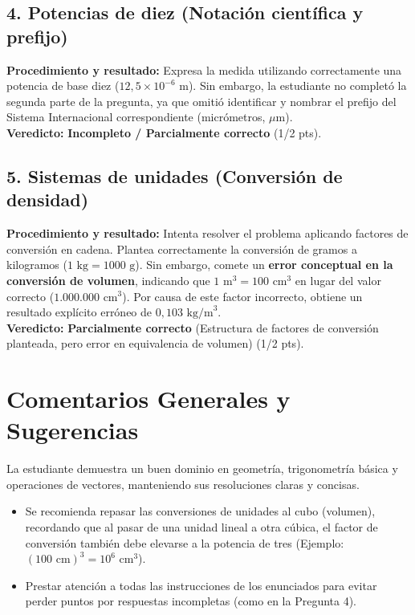 \documentclass[12pt]{article}
\begin{document}
\subsection*{4. Potencias de diez (Notación científica y prefijo)}
\textbf{Procedimiento y resultado:} Expresa la medida utilizando correctamente una potencia de base diez ($12,5 \times 10^{-6}$ m). Sin embargo, la estudiante no completó la segunda parte de la pregunta, ya que omitió identificar y nombrar el prefijo del Sistema Internacional correspondiente (micrómetros, $\mu$m). \\
\textbf{Veredicto:} \textbf{Incompleto / Parcialmente correcto} (1/2 pts).

\subsection*{5. Sistemas de unidades (Conversión de densidad)}
\textbf{Procedimiento y resultado:} Intenta resolver el problema aplicando factores de conversión en cadena. Plantea correctamente la conversión de gramos a kilogramos ($1 \text{ kg} = 1000 \text{ g}$). Sin embargo, comete un \textbf{error conceptual en la conversión de volumen}, indicando que $1 \text{ m}^3 = 100 \text{ cm}^3$ en lugar del valor correcto ($1.000.000 \text{ cm}^3$). Por causa de este factor incorrecto, obtiene un resultado explícito erróneo de $0,103 \text{ kg/m}^3$. \\
\textbf{Veredicto:} \textbf{Parcialmente correcto} (Estructura de factores de conversión planteada, pero error en equivalencia de volumen) (1/2 pts).

\vspace{0.5cm}
\section*{Comentarios Generales y Sugerencias}
La estudiante demuestra un buen dominio en geometría, trigonometría básica y operaciones de vectores, manteniendo sus resoluciones claras y concisas. 
\begin{itemize}
    \item Se recomienda repasar las conversiones de unidades al cubo (volumen), recordando que al pasar de una unidad lineal a otra cúbica, el factor de conversión también debe elevarse a la potencia de tres (Ejemplo: $(100 \text{ cm})^3 = 10^6 \text{ cm}^3$).
    \item Prestar atención a todas las instrucciones de los enunciados para evitar perder puntos por respuestas incompletas (como en la Pregunta 4).
\end{itemize}
\end{document}
